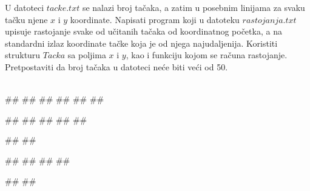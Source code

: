 \begin{Exercise}[label=p3_07] 
 U datoteci $tacke.txt$ se nalazi broj tačaka, a zatim u posebnim linijama za svaku ta\v cku njene $x$ i $y$ koordinate. Napisati program koji u datoteku $rastojanja.txt$ upisuje rastojanje svake od učitanih tačaka od koordinatnog početka, a na standardni izlaz koordinate tačke koja je od njega najudaljenija. Koristiti strukturu $Tacka$ sa poljima $x$ i $y$, kao i funkciju kojom se računa rastojanje. Pretpostaviti da broj tačaka u datoteci neće biti veći od 50. \\  
\\
\begin{miditest}
\begin{upotreba}{1}
##
##
##
##
##
##

##
##
##
##
##

#\naslovIzlaz#
##
\end{upotreba}
\end{miditest}
\begin{miditest}
\begin{upotreba}{2}
##
##
##
##

#\naslovIzlaz#
##
\end{upotreba}
\end{miditest}
\end{Exercise}
\begin{Answer}[ref=p3_07]
\end{Answer}

